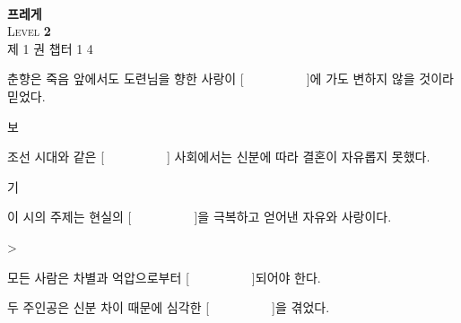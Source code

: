 \documentclass[fs95,seriesFre]{korfarm-base}
\begin{document}
\thispagestyle{kfBlank}
\kfBookCoverBg
\vspace*{\kfBookCoverVspace}
\begin{center}
{\kfLogoLg}\\[14pt]
{\fontsize{72}{84}\selectfont\bfseries\kfBookCoverColor 프레게}\\[18pt]
{\fontsize{28}{32}\selectfont\kfBookCoverSubColor \textsc{Level} \textbf{2}}\\[22pt]
{\large\kfBookCoverSubColor 제 1 권 \quad\textbar\quad 챕터 1\textendash{} 4}
\end{center}
\vfill
\hfill\kfSeriesBadge\hspace{15mm}
\clearpage
{}
\begin{kfChapterAreaList}
\end{kfChapterAreaList}



\kfActivityBg \par{}\par\nopagebreak[4]\smallskip\nopagebreak[4]
\begin{kfBlankList}
\kfBlankItem 춘향은 죽음 앞에서도 도련님을 향한 사랑이 [　　　　　]에 가도 변하지 않을 것이라 믿었다.
\begin{kfEvidence}보\end{kfEvidence}
\kfBlankItem 조선 시대와 같은 [　　　　　] 사회에서는 신분에 따라 결혼이 자유롭지 못했다.
\begin{kfEvidence}기\end{kfEvidence}
\kfBlankItem 이 시의 주제는 현실의 [　　　　　]을 극복하고 얻어낸 자유와 사랑이다.
\begin{kfEvidence}>\end{kfEvidence}
\kfBlankItem 모든 사람은 차별과 억압으로부터 [　　　　　]되어야 한다.
\begin{kfEvidence}\end{kfEvidence}
\kfBlankItem 두 주인공은 신분 차이 때문에 심각한 [　　　　　]을 겪었다.
\begin{kfEvidence}\end{kfEvidence}
\end{kfBlankList}
\end{document}
